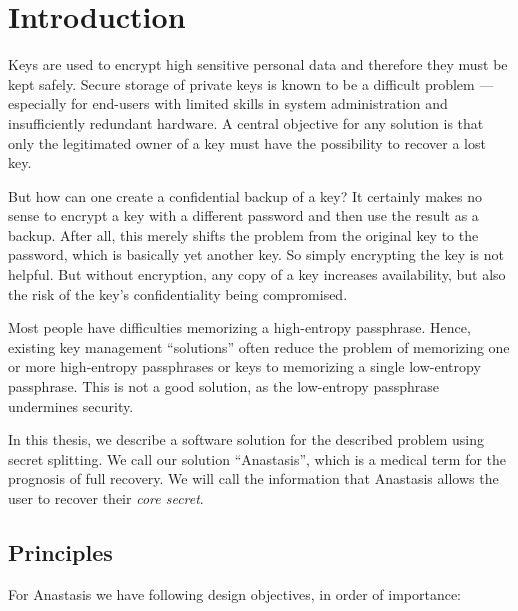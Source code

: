 \section{Introduction}

Keys are used to encrypt high sensitive personal data and therefore
they must be kept safely.  Secure storage of private keys is known to
be a difficult problem --- especially for end-users with limited
skills in system administration and insufficiently redundant hardware.
A central objective for any solution is that only the legitimated
owner of a key must have the possibility to recover a lost key.

But how can one create a confidential backup of a key? It certainly
makes no sense to encrypt a key with a different password and then use
the result as a backup. After all, this merely shifts the problem from
the original key to the password, which is basically yet another key.
So simply encrypting the key is not helpful.  But without encryption,
any copy of a key increases availability, but also the risk of the
key's confidentiality being compromised.

Most people have difficulties memorizing a high-entropy
passphrase. Hence, existing key management ``solutions'' often reduce
the problem of memorizing one or more high-entropy passphrases or keys
to memorizing a single low-entropy passphrase. This is not a good
solution, as the low-entropy passphrase undermines security.

In this thesis, we describe a software solution for the described
problem using secret splitting.  We call our solution ``Anastasis'',
which is a medical term for the prognosis of full recovery.  We will
call the information that Anastasis allows the user to recover their
{\em core secret}.

\subsection{Principles}

For Anastasis we have following design objectives, in order of importance:


